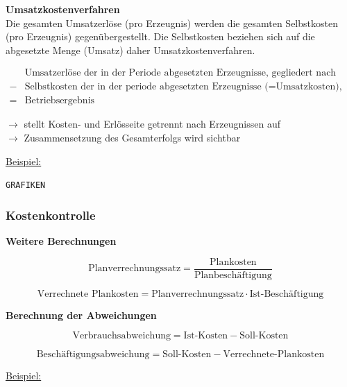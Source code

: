 \documentclass[a4paper,11pt, twoside]{article}
\begin{document}
\textbf{Umsatzkostenverfahren}\\
Die gesamten Umsatzerlöse (pro Erzeugnis) werden die gesamten Selbstkosten (pro Erzeugnis) gegenübergestellt. Die Selbstkosten beziehen sich auf die abgesetzte Menge (Umsatz) daher Umsatzkostenverfahren.

\begin{equation}
\begin{aligned}
 & \text{Umsatzerlöse der in der Periode abgesetzten Erzeugnisse, gegliedert nach Erzeugnisarten}\\
 - & \text{Selbstkosten der in der periode abgesetzten Erzeugnisse (=Umsatzkosten), gegliedert nach Erzeugnisarten}\\\hline
 = & \text{Betriebsergebnis}
 & \end{aligned}
\end{equation}

$\rightarrow$ stellt Kosten- und Erlösseite getrennt nach Erzeugnissen auf\\
$\rightarrow$ Zusammensetzung des Gesamterfolgs wird sichtbar

\underline{Beispiel:}

\texttt{GRAFIKEN}

\subsubsection*{Kostenkontrolle}

\textbf{Weitere Berechnungen}

\begin{equation}
 \text{Planverrechnungssatz} = \frac{\text{Plankosten}}{\text{Planbeschäftigung}} 
\end{equation}

\begin{equation}
 \text{Verrechnete Plankosten} = \text{Planverrechnungssatz} \cdot \text{Ist-Beschäftigung} 
\end{equation}

\textbf{Berechnung der Abweichungen}

\begin{equation}
 \text{Verbrauchsabweichung} = \text{Ist-Kosten} - \text{Soll-Kosten} 
\end{equation}

\begin{equation}
 \text{Beschäftigungsabweichung} = \text{Soll-Kosten} - \text{Verrechnete-Plankosten} 
\end{equation}

\underline{Beispiel:}
\end{document}
